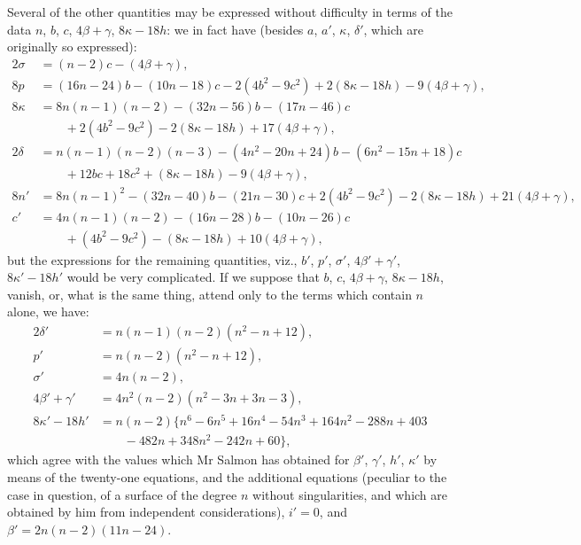 \documentclass[11pt,a4paper]{book}
\begin{document}
Several of the other quantities may be expressed without difficulty in terms of the data $n$, $b$, $c$, $4\beta+\gamma$, $8\kappa-18h$: we in fact have (besides $a$, $a'$, $\kappa$, $\delta'$, which are originally so expressed):
\begin{align*}
2\sigma &= (n-2)c-(4\beta+\gamma),\\
8p &= (16n-24)b-(10n-18)c-2(4b^2-9c^2)+2(8\kappa-18h)-9(4\beta+\gamma),\\
8\kappa &= 8n(n-1)(n-2)-(32n-56)b-(17n-46)c\\
&\qquad +2(4b^2-9c^2)-2(8\kappa-18h)+17(4\beta+\gamma),\\
2\delta &= n(n-1)(n-2)(n-3)-(4n^2-20n+24)b-(6n^2-15n+18)c\\
&\qquad +12bc+18c^2+(8\kappa-18h)-9(4\beta+\gamma),\\
8n' &= 8n(n-1)^2-(32n-40)b-(21n-30)c+2(4b^2-9c^2)-2(8\kappa-18h)+21(4\beta+\gamma),\\
c' &= 4n(n-1)(n-2)-(16n-28)b-(10n-26)c\\
&\qquad +(4b^2-9c^2)-(8\kappa-18h)+10(4\beta+\gamma),
\end{align*}
but the expressions for the remaining quantities, viz., $b'$, $p'$, $\sigma'$, $4\beta'+\gamma'$, $8\kappa'-18h'$ would be very complicated. If we suppose that $b$, $c$, $4\beta+\gamma$, $8\kappa-18h$, vanish, or, what is the same thing, attend only to the terms which contain $n$ alone, we have:
\begin{align*}
2\delta' &= n(n-1)(n-2)(n^2-n+12),\\
p' &= n(n-2)(n^2-n+12),\\
\sigma' &= 4n(n-2),\\
4\beta'+\gamma' &= 4n^2(n-2)(n^2-3n+3n-3),\\
8\kappa'-18h' &= n(n-2)\{n^6-6n^5+16n^4-54n^3+164n^2-288n+403\\
&\qquad -482n+348n^2-242n+60\},
\end{align*}
which agree with the values which Mr Salmon has obtained for $\beta'$, $\gamma'$, $h'$, $\kappa'$ by means of the twenty-one equations, and the additional equations (peculiar to the case in question, of a surface of the degree $n$ without singularities, and which are obtained by him from independent considerations), $i'=0$, and $\beta'=2n(n-2)(11n-24)$.
\end{document}
